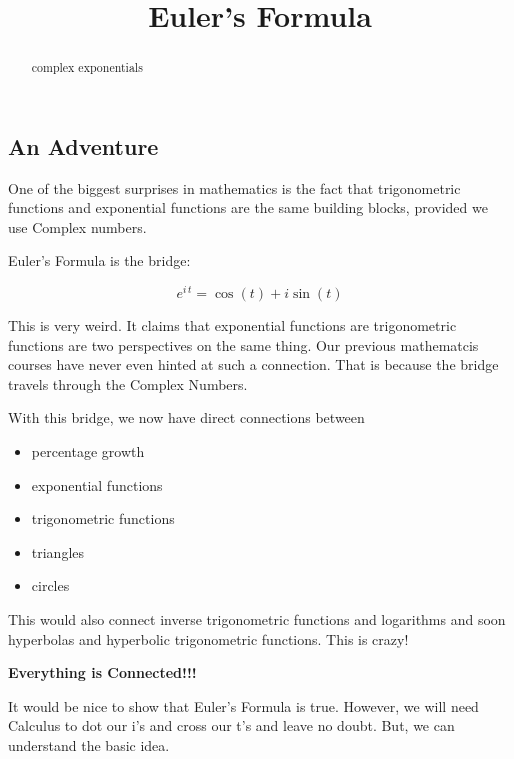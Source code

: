 \documentclass{ximera}
\title{Euler's Formula}
\begin{document}
\begin{abstract}
complex exponentials
\end{abstract}
\maketitle






\subsection*{An Adventure}




One of the biggest surprises in mathematics is the fact that trigonometric functions and exponential functions are the same building blocks, provided we use Complex numbers. 


Euler's Formula is the bridge:



\[    e^{i \, t} = \cos(t) + i \sin(t)    \]



This is very weird.  It claims that exponential functions are trigonometric functions are two perspectives on the same thing.  Our previous mathematcis courses have never even hinted at such a connection.  That is because the bridge  travels through the Complex Numbers.



With this bridge, we now have direct connections between


\begin{itemize}
\item percentage growth
\item exponential functions
\item trigonometric functions
\item triangles
\item circles
\end{itemize}

This would also connect inverse trigonometric functions and logarithms and soon hyperbolas and hyperbolic trigonometric functions.  This is crazy!


\begin{center}
\textbf{\textcolor{red!80!black}{Everything is Connected!!!}}
\end{center}






It would be nice to show that Euler's Formula is true.  However, we will need Calculus to dot our i's and cross our t's and leave no doubt.   But, we can understand the basic idea. 
\end{document}
